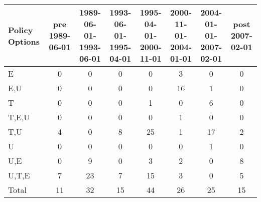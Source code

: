 \begin{tabular}{lccccccc}
\hline\hline 
\addlinespace 
Policy Options & pre 1989-06-01 & \shortstack{1989-06-01- \\ 1993-06-01} & \shortstack{1993-06-01- \\ 1995-04-01} & \shortstack{1995-04-01- \\ 2000-11-01} & \shortstack{2000-11-01- \\ 2004-01-01} & \shortstack{2004-01-01- \\ 2007-02-01} & post 2007-02-01 \\ 
\hline 
E & 0 & 0 & 0 & 0 & 3 & 0 & 0 \\
E,U & 0 & 0 & 0 & 0 & 16 & 1 & 0 \\
T & 0 & 0 & 0 & 1 & 0 & 6 & 0 \\
T,E,U & 0 & 0 & 0 & 0 & 1 & 0 & 0 \\
T,U & 4 & 0 & 8 & 25 & 1 & 17 & 2 \\
U & 0 & 0 & 0 & 0 & 0 & 1 & 0 \\
U,E & 0 & 9 & 0 & 3 & 2 & 0 & 8 \\
U,T,E & 7 & 23 & 7 & 15 & 3 & 0 & 5 \\
\addlinespace 
Total & 11 & 32 & 15 & 44 & 26 & 25 & 15 \\
\hline 
\end{tabular}